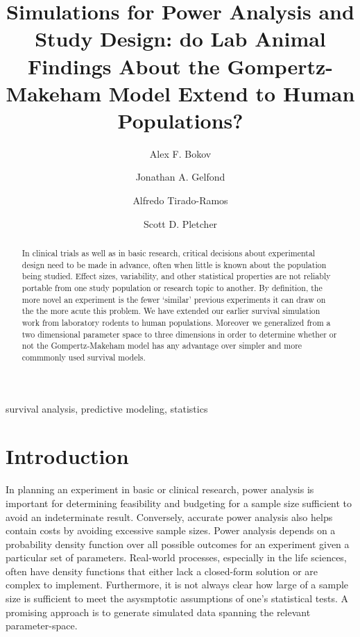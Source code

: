 \documentclass[review, authoryear]{elsarticle}
\begin{document}
  

\begin{frontmatter}

\title{Simulations for Power Analysis and Study Design: do Lab Animal Findings
About the Gompertz-Makeham Model Extend to Human Populations?}

\author[deb]{Alex F. Bokov}
\author[deb]{Jonathan A. Gelfond}
\author[deb]{Alfredo Tirado-Ramos}
\author[um]{Scott D. Pletcher}



\address[deb]{UT Health, San Antonio}
\address[um]{University of Michigan, Ann Arbor}


\begin{abstract}
In clinical trials as well as in basic research, critical decisions
about experimental design need to be made in advance, often when little
is known about the population being studied. Effect sizes, variability,
and other statistical properties are not reliably portable from one
study population or research topic to another. By definition, the more
novel an experiment is the fewer `similar' previous experiments it can
draw on the the more acute this problem. We have extended our earlier
survival simulation work from laboratory rodents to human populations.
Moreover we generalized from a two dimensional parameter space to three
dimensions in order to determine whether or not the Gompertz-Makeham
model has any advantage over simpler and more commmonly used survival
models.
\end{abstract}

\begin{keyword}
survival analysis, predictive modeling, statistics
\end{keyword}

\end{frontmatter}

\section{Introduction}\label{introduction}

In planning an experiment in basic or clinical research, power analysis
is important for determining feasibility and budgeting for a sample size
sufficient to avoid an indeterminate result. Conversely, accurate power
analysis also helps contain costs by avoiding excessive sample sizes.
Power analysis depends on a probability density function over all
possible outcomes for an experiment given a particular set of
parameters. Real-world processes, especially in the life sciences, often
have density functions that either lack a closed-form solution or are
complex to implement. Furthermore, it is not always clear how large of a
sample size is sufficient to meet the asysmptotic assumptions of one's
statistical tests. A promising approach is to generate simulated data
spanning the relevant parameter-space.
\end{document}
